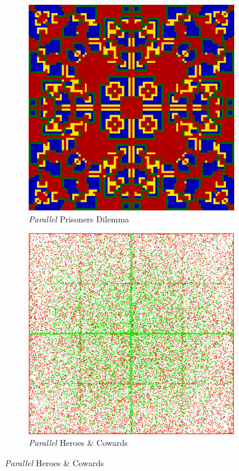 \begin{figure}
    \begin{subfigure}[b]{0.4\textwidth}
		\centering
       	\includegraphics[width=.7\textwidth, angle=0]{./fig/par_99x99_436steps_MSG_haskell.png}
        \caption{\textit{Parallel} Prisoners Dilemma}
        \label{fig:pd_par}
    \end{subfigure}
    \begin{subfigure}[b]{0.4\textwidth}
    	\centering
        \includegraphics[width=.7\textwidth, angle=0]{./fig/par_HAC_100_000_500steps_java.png}
        \caption{\textit{Parallel} Heroes \& Cowards}
        \label{fig:hac_par}
    \end{subfigure}
        


\end{figure}

